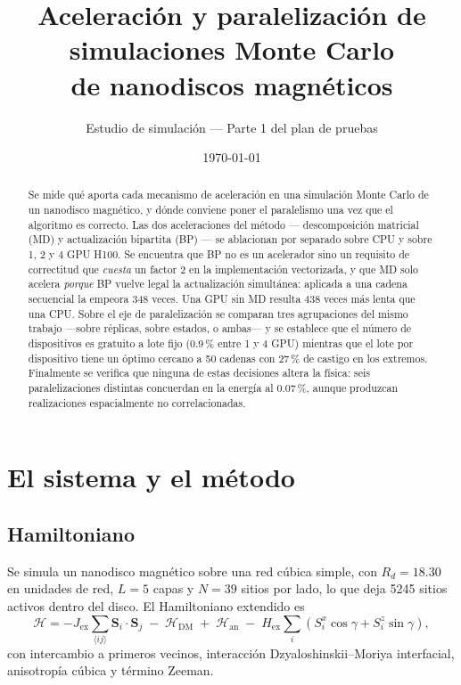 \documentclass[11pt,a4paper]{article}
\title{Aceleraci\'on y paralelizaci\'on de simulaciones Monte Carlo\\
       de nanodiscos magn\'eticos}
\author{Estudio de simulaci\'on --- Parte 1 del plan de pruebas}
\date{\today}
\begin{document}
\maketitle

\begin{abstract}
Se mide qu\'e aporta cada mecanismo de aceleraci\'on en una simulaci\'on Monte
Carlo de un nanodisco magn\'etico, y d\'onde conviene poner el paralelismo una
vez que el algoritmo es correcto. Las dos aceleraciones del m\'etodo ---
descomposici\'on matricial (MD) y actualizaci\'on bipartita (BP) --- se ablacionan
por separado sobre CPU y sobre 1, 2 y 4 GPU H100. Se encuentra que BP no es un
acelerador sino un requisito de correctitud que \emph{cuesta} un factor 2 en la
implementaci\'on vectorizada, y que MD solo acelera \emph{porque} BP vuelve legal
la actualizaci\'on simult\'anea: aplicada a una cadena secuencial la empeora 348
veces. Una GPU sin MD resulta 438 veces m\'as lenta que una CPU. Sobre el eje de
paralelizaci\'on se comparan tres agrupaciones del mismo trabajo ---sobre
r\'eplicas, sobre estados, o ambas--- y se establece que el n\'umero de
dispositivos es gratuito a lote fijo (0.9\,\% entre 1 y 4 GPU) mientras que el
lote por dispositivo tiene un \'optimo cercano a 50 cadenas con 27\,\% de castigo
en los extremos. Finalmente se verifica que ninguna de estas decisiones altera la
f\'isica: seis paralelizaciones distintas concuerdan en la energ\'ia al
0.07\,\%, aunque produzcan realizaciones espacialmente no correlacionadas.
\end{abstract}

\tableofcontents

\section{El sistema y el m\'etodo}

\subsection{Hamiltoniano}

Se simula un nanodisco magn\'etico sobre una red c\'ubica simple, con
$R_d = 18.30$ en unidades de red, $L = 5$ capas y $N = 39$ sitios por lado, lo
que deja \num{5245} sitios activos dentro del disco. El Hamiltoniano extendido es
\begin{equation}
\mathcal{H} = -J_{\mathrm{ex}}\!\!\sum_{\langle ij\rangle}\! \mathbf{S}_i\cdot\mathbf{S}_j
 \; - \; \mathcal{H}_{\mathrm{DM}} \; + \; \mathcal{H}_{\mathrm{an}}
 \; - \; H_{\mathrm{ex}}\!\sum_i \left(S_i^x\cos\gamma + S_i^z\sin\gamma\right),
\end{equation}
con intercambio a primeros vecinos, interacci\'on Dzyaloshinskii--Moriya
interfacial, anisotrop\'ia c\'ubica y t\'ermino Zeeman.
\end{document}
